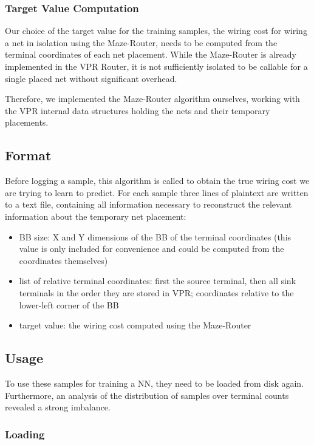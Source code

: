 \subsubsection{Target Value Computation}

Our choice of the target value for the training samples, the wiring cost for wiring a net in isolation using the Maze-Router, needs to be computed from the terminal coordinates of each net placement. While the Maze-Router is already implemented in the \gls{VPR} Router, it is not sufficiently isolated to be callable for a single placed net without significant overhead.

Therefore, we implemented the Maze-Router algorithm ourselves, working with the \gls{VPR} internal data structures holding the nets and their temporary placements.

\subsection{Format}

Before logging a sample, this algorithm is called to obtain the true wiring cost we are trying to learn to predict. For each sample three lines of plaintext are written to a text file, containing all information necessary to reconstruct the relevant information about the temporary net placement:

\begin{itemize}
	\item \gls{BB} size: X and Y dimensions of the \gls{BB} of the terminal coordinates (this value is only included for convenience and could be computed from the coordinates themselves)
	\item list of relative terminal coordinates: first the source terminal, then all sink terminals in the order they are stored in \gls{VPR}; coordinates relative to the lower-left corner of the \gls{BB}
	\item target value: the wiring cost computed using the Maze-Router
\end{itemize}

\subsection{Usage}

To use these samples for training a \gls{NN}, they need to be loaded from disk again. Furthermore, an analysis of the distribution of samples over terminal counts revealed a strong imbalance.

\subsubsection{Loading}

